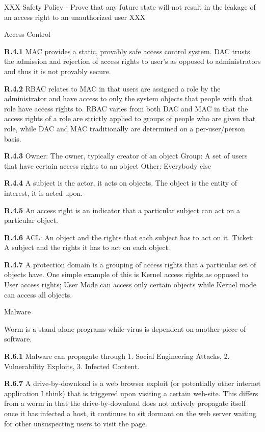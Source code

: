 \documentclass[8pt]{extreport}
\begin{document}
XXX Safety Policy - Prove that any future state will not result in the leakage
of an access right to an unauthorized user XXX

{\Huge Access Control}

{\bf R.4.1} MAC provides a static, provably safe access control system. DAC
trusts the admission and rejection of access rights to user's as opposed to
administrators and thus it is not provably secure.

{\bf R.4.2} RBAC relates to MAC in that users are assigned a role by the
administrator and have access to only the system objects that people with that
role have access rights to. RBAC varies from both DAC and MAC in that the access
rights of a role are strictly applied to groups of people who are given that
role, while DAC and MAC traditionally are determined on a per-user/person basis.

{\bf R.4.3} 
Owner: The owner, typically creator of an object
Group: A set of users that have certain access rights to an object
Other: Everybody else

{\bf R.4.4} A subject is the actor, it acts on objects. The object is the entity
of interest, it is acted upon.

{\bf R.4.5} An access right is an indicator that a particular subject can act on
a particular object.

{\bf R.4.6}
ACL: An object and the rights that each subject has to act on it.
Ticket: A subject and the rights it has to act on each object.

{\bf R.4.7}
A protection domain is a grouping of access rights that a particular set of
objects have. One simple example of this is Kernel access rights as opposed to
User access rights; User Mode can access only certain objects while Kernel mode
can access all objects.


{\Huge Malware}

Worm is a stand alone programs while virus is dependent on another piece of
software.

{\bf R.6.1} Malware can propagate through 
1. Social Engineering Attacks, 
2. Vulnerability Exploits, 
3. Infected Content.

{\bf R.6.7} A drive-by-download is a web browser exploit (or potentially other
internet application I think) that is triggered upon visiting a certain
web-site. This differs from a worm in that the drive-by-download does not
actively propagate itself once it has infected a host, it continues to sit
dormant on the web server waiting for other unsuspecting users to visit the
page.
\end{document}
